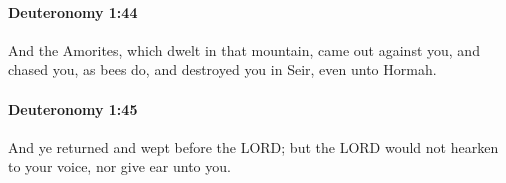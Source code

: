 		\paragraph{Deuteronomy 1:44} %
			\label{DEUTERONOMY-1-44}

			And the Amorites, which dwelt in that mountain, came out against you, and chased you, as bees do, and destroyed you in Seir, even unto Hormah.


		\paragraph{Deuteronomy 1:45} %
			\label{DEUTERONOMY-1-45}

			And ye returned and wept before the LORD; but the LORD would not hearken to your voice, nor give ear unto you.


